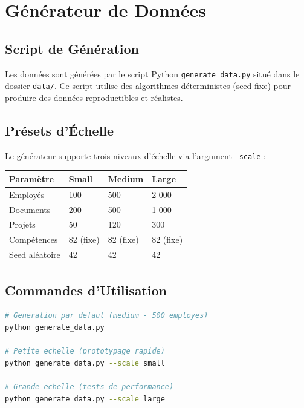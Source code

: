 \documentclass[12pt,a4paper]{article}
\begin{document}
\section{Générateur de Données}

\subsection{Script de Génération}

Les données sont générées par le script Python \texttt{generate\_data.py} situé dans le dossier \texttt{data/}. Ce script utilise des algorithmes déterministes (seed fixe) pour produire des données reproductibles et réalistes.

\subsection{Présets d'Échelle}

Le générateur supporte trois niveaux d'échelle via l'argument \texttt{--scale} :

\begin{longtable}{|p{3cm}|p{3cm}|p{3cm}|p{3cm}|}
\hline
\rowcolor{bleu!15}
\textbf{Paramètre} & \textbf{Small} & \textbf{Medium} & \textbf{Large} \\
\hline
Employés & 100 & 500 & 2 000 \\
\hline
Documents & 200 & 500 & 1 000 \\
\hline
Projets & 50 & 120 & 300 \\
\hline
Compétences & 82 (fixe) & 82 (fixe) & 82 (fixe) \\
\hline
Seed aléatoire & 42 & 42 & 42 \\
\hline
\end{longtable}

\subsection{Commandes d'Utilisation}

\begin{lstlisting}[language=bash]
# Generation par defaut (medium - 500 employes)
python generate_data.py

# Petite echelle (prototypage rapide)
python generate_data.py --scale small

# Grande echelle (tests de performance)
python generate_data.py --scale large
\end{lstlisting}
\end{document}
